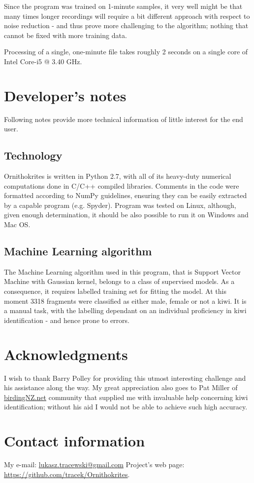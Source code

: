 \documentclass[paper=a4, fontsize=11pt]{scrartcl}	%
\numberwithin{equation}{section}		%
\numberwithin{figure}{section}			%
\numberwithin{table}{section}				%
\begin{document}
Since the program was trained on 1-minute samples, it very well might be that many times longer recordings will require a bit different approach with respect to noise reduction - and thus prove more challenging to the algorithm; nothing that cannot be fixed with more training data.

Processing of a single, one-minute file takes roughly 2 seconds on a single core of Intel Core-i5 @ 3.40 GHz.

\section{Developer's notes}
Following notes provide more technical information of little interest for the end user.
\subsection{Technology}
Ornithokrites is written in Python 2.7, with all of its heavy-duty numerical computations done in C/C++ compiled libraries. Comments in the code were formatted according to NumPy guidelines, ensuring they can be easily extracted by a capable program (e.g. Spyder). Program was tested on Linux, although, given enough determination, it should be also possible to run it on Windows and Mac OS.
\subsection{Machine Learning algorithm}
The Machine Learning algorithm used in this program, that is Support Vector Machine with Gaussian kernel, belongs to a class of supervised models. As a consequence, it requires labelled training set for fitting the model. At this moment 3318 fragments were classified as either male, female or not a kiwi. It is a manual task, with the labelling dependant on an individual proficiency in kiwi identification - and hence prone to errors.

\section{Acknowledgments}
I wish to thank Barry Polley for providing this utmost interesting challenge and his assistance along the way. My great appreciation also goes to Pat Miller of \url{birdingNZ.net} community that supplied me with invaluable help concerning kiwi identification; without his aid I would not be able to achieve such high accuracy.

\section{Contact information}
My e-mail: \href{mailto:lukasz.tracewski@gmail.com}{lukasz.tracewski@gmail.com}
\newline
Project's web page: \url{https://github.com/tracek/Ornithokrites}.

\end{document}
